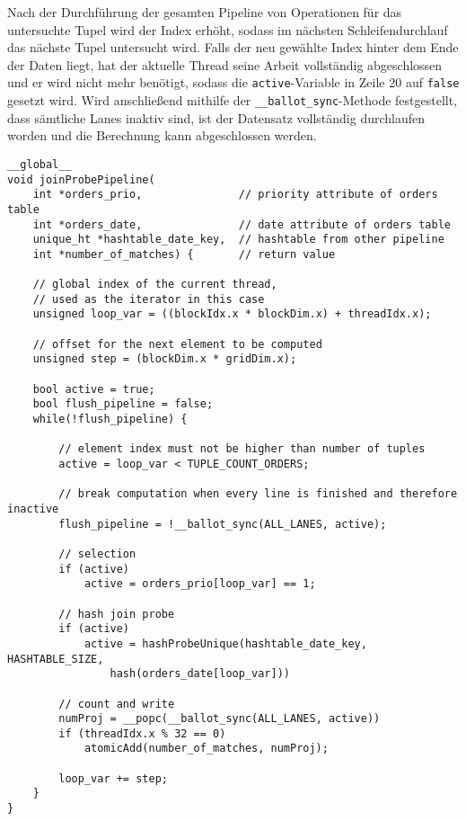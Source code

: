 Nach der Durchführung der gesamten Pipeline von Operationen für das untersuchte Tupel wird der Index erhöht, sodass im nächsten Schleifendurchlauf das nächste Tupel untersucht wird.
Falls der neu gewählte Index hinter dem Ende der Daten liegt, hat der aktuelle Thread seine Arbeit vollständig abgeschlossen und er wird nicht mehr benötigt, sodass die \texttt{active}-Variable in Zeile 20 auf \texttt{false} gesetzt wird.
Wird anschließend mithilfe der \texttt{\_\_ballot\_sync}-Methode festgestellt, dass sämtliche Lanes inaktiv sind, ist der Datensatz vollständig durchlaufen worden und die Berechnung kann abgeschlossen werden.

\begin{lstlisting}[language=MyC++,
caption=Generierter Kernel für den Beispielplan,
label=pipelining_example_code,
linebackgroundcolor={%
\ifnum\value{lstnumber}>24
	\ifnum\value{lstnumber}<28
		\color{red!25}
	\fi
\fi
\ifnum\value{lstnumber}>28
	\ifnum\value{lstnumber}<33
		\color{green!25}
	\fi
\fi
\ifnum\value{lstnumber}>33
	\ifnum\value{lstnumber}<38
		\color{yellow!25}
	\fi
\fi
}]
__global__
void joinProbePipeline(
	int *orders_prio,              	// priority attribute of orders table
	int *orders_date,               // date attribute of orders table
	unique_ht *hashtable_date_key,  // hashtable from other pipeline
	int *number_of_matches) {       // return value
	
	// global index of the current thread,
	// used as the iterator in this case
	unsigned loop_var = ((blockIdx.x * blockDim.x) + threadIdx.x);
	
	// offset for the next element to be computed
	unsigned step = (blockDim.x * gridDim.x);
	
	bool active = true;
	bool flush_pipeline = false;
	while(!flush_pipeline) {
	
		// element index must not be higher than number of tuples
		active = loop_var < TUPLE_COUNT_ORDERS;
		
		// break computation when every line is finished and therefore inactive
		flush_pipeline = !__ballot_sync(ALL_LANES, active);
		
		// selection
		if (active)
			active = orders_prio[loop_var] == 1;
		
		// hash join probe
		if (active)
			active = hashProbeUnique(hashtable_date_key, HASHTABLE_SIZE, 
				hash(orders_date[loop_var]))
		
		// count and write
		numProj = __popc(__ballot_sync(ALL_LANES, active))
		if (threadIdx.x % 32 == 0)
			atomicAdd(number_of_matches, numProj);
		
		loop_var += step;
	}
}
\end{lstlisting}

